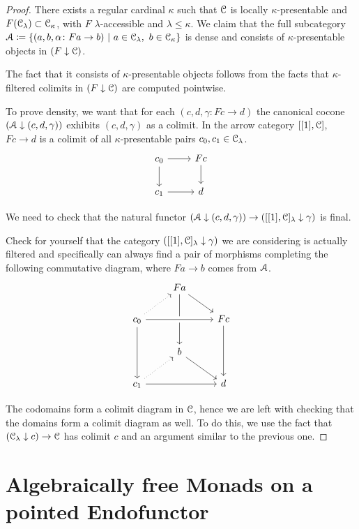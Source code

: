 \documentclass[a4paper,11pt,oneside,openany]{scrbook}
\begin{document}
\begin{proof}
	There exists a regular cardinal $\kappa$ such that $\operatorname{\mathcal{C}}$ is locally $\kappa$-presentable and $F(\operatorname{\mathcal{C}}_\lambda)\subset\operatorname{\mathcal{C}}_\kappa$, with $F$ $\lambda$-accessible and $\lambda\leq\kappa$. We claim that the full subcategory $\A\coloneqq\{(a,b,\alpha\colon Fa\rightarrow b)\ |\ a\in\C_\lambda,\ b\in\C_\kappa\}$ is dense and consists of $\kappa$-presentable objects in $(F\downarrow\operatorname{\mathcal{C}})$.

	The fact that it consists of $\kappa$-presentable objects follows from the facts that $\kappa$-filtered colimits in $(F\downarrow\operatorname{\mathcal{C}})$ are computed pointwise.

	To prove density, we want that for each $(c,d,\gamma\colon Fc\rightarrow d)$ the canonical cocone $(\operatorname{\mathcal{A}}\downarrow (c,d,\gamma))$ exhibits $(c,d,\gamma)$ as a colimit. In the arrow category $[[1],\operatorname{\mathcal{C}}]$, $Fc\rightarrow d$ is a colimit of all $\kappa$-presentable pairs $c_0,c_1\in\operatorname{\mathcal{C}}_\lambda$.
	\[
		\begin{tikzcd}
			c_0\ar[d]\ar[r]
			& Fc\ar[d] \\
			c_1\ar[r]
			& d
		\end{tikzcd}
	\]

	We need to check that the natural functor $(\operatorname{\mathcal{A}}\downarrow (c,d,\gamma))\rightarrow ([[1],\operatorname{\mathcal{C}}]_\lambda\downarrow\gamma)$ is final.

	Check for yourself that the category $([[1],\operatorname{\mathcal{C}}]_\lambda\downarrow\gamma)$ we are considering is actually filtered and specifically can always find a pair of morphisms completing the following commutative diagram, where $Fa\rightarrow b$ comes from $\operatorname{\mathcal{A}}$.
	\[
		\begin{tikzcd}
			& Fa\ar[dr]\ar[dd] \\
			c_0\ar[ur, dotted]\ar[rr, crossing over]\ar[dd]
			&& Fc\ar[dd] \\
			& b\ar[dr] \\
			c_1\ar[ur, dotted]\ar[rr]
			&& d
		\end{tikzcd}
	\]

	The codomains form a colimit diagram in $\operatorname{\mathcal{C}}$, hence we are left with checking that the domains form a colimit diagram as well. To do this, we use the fact that $(\operatorname{\mathcal{C}}_\lambda\downarrow c)\rightarrow\operatorname{\mathcal{C}}$ has colimit $c$ and an argument similar to the previous one.
\end{proof}

\section{Algebraically free Monads on a pointed Endofunctor}
\end{document}
